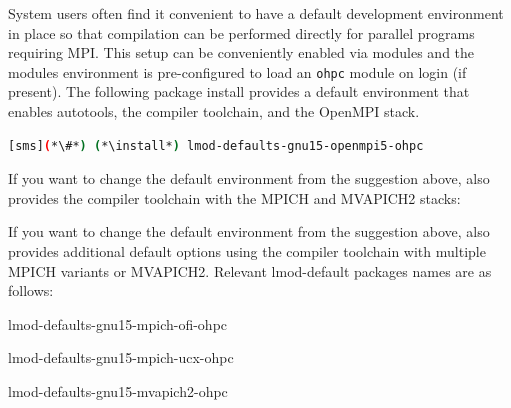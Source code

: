 System users often find it convenient to have a default development environment
in place so that compilation can be performed directly for parallel programs
requiring MPI. This setup can be conveniently enabled via modules and the \OHPC{}
modules environment is pre-configured to load an \texttt{ohpc} module on login
(if present). The following package install provides a default
environment that enables autotools, the \GNU{} compiler toolchain, and the
OpenMPI stack.

\begin{lstlisting}[language=bash]
[sms](*\#*) (*\install*) lmod-defaults-gnu15-openmpi5-ohpc
\end{lstlisting}

\begin{center}
\begin{tcolorbox}[]
\small
{}
If you want to change the default environment from the suggestion above, \OHPC{}
also provides the \GNU{} compiler toolchain with the MPICH and MVAPICH2 stacks:
\fi

If you want to change the default environment from the suggestion above, \OHPC{}
also provides additional default options using the \GNU{} compiler toolchain
with multiple MPICH variants or MVAPICH2. Relevant lmod-default packages names
are as follows:
\fi

\begin{itemize*}
\item lmod-defaults-gnu15-mpich-ofi-ohpc
\item lmod-defaults-gnu15-mpich-ucx-ohpc
\item lmod-defaults-gnu15-mvapich2-ohpc
\fi
\end{itemize*}
\end{tcolorbox}
\end{center}
